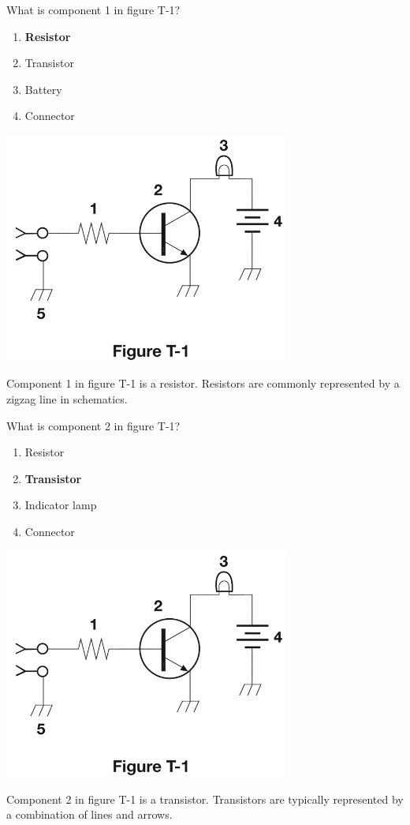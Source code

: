 \begin{tcolorbox}[
    colback=gray!10!white,
    colframe=black!75!black,
    title={T6C02},
    sidebyside,
    sidebyside align=top,
    lefthand width=0.45\textwidth
]
What is component 1 in figure T-1?
\begin{enumerate}[label=\Alph*),noitemsep]
    \item \textbf{Resistor}
    \item Transistor
    \item Battery
    \item Connector
\end{enumerate}
\tcblower
\includegraphics[width=0.7\textwidth]{images/t1.png}
\end{tcolorbox}
Component 1 in figure T-1 is a resistor. Resistors are commonly represented by a zigzag line in schematics.

\begin{tcolorbox}[
    colback=gray!10!white,
    colframe=black!75!black,
    title={T6C03},
    sidebyside,
    sidebyside align=top,
    lefthand width=0.45\textwidth
]
What is component 2 in figure T-1?
\begin{enumerate}[label=\Alph*),noitemsep]
    \item Resistor
    \item \textbf{Transistor}
    \item Indicator lamp
    \item Connector
\end{enumerate}
\tcblower
\includegraphics[width=0.7\textwidth]{images/t1.png}
\end{tcolorbox}
Component 2 in figure T-1 is a transistor. Transistors are typically represented by a combination of lines and arrows.

